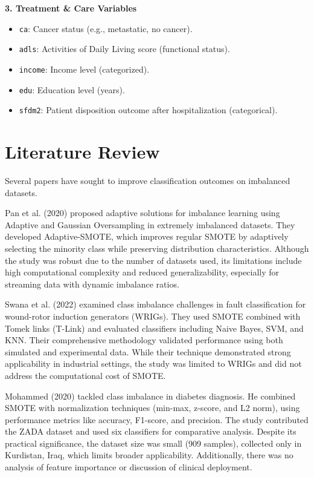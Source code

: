 \textbf{3. Treatment \& Care Variables}
\begin{itemize}
    \item \texttt{ca}: Cancer status (e.g., metastatic, no cancer).
    \item \texttt{adls}: Activities of Daily Living score (functional status).
    \item \texttt{income}: Income level (categorized).
    \item \texttt{edu}: Education level (years).
    \item \texttt{sfdm2}: Patient disposition outcome after hospitalization (categorical).
\end{itemize}

\section{Literature Review}

Several papers have sought to improve classification outcomes on imbalanced datasets.

Pan et al. (2020) proposed adaptive solutions for imbalance learning using
 Adaptive and Gaussian Oversampling in extremely imbalanced datasets. 
 They developed Adaptive-SMOTE, which improves regular SMOTE by adaptively
  selecting the minority class while preserving distribution characteristics. 
  Although the study was robust due to the number of datasets used, its limitations
   include high computational complexity and reduced generalizability, especially for streaming data with dynamic imbalance ratios.

Swana et al. (2022) examined class imbalance challenges in fault classification for
 wound-rotor induction generators (WRIGs). They used SMOTE combined with Tomek links 
 (T-Link) and evaluated classifiers including Naive Bayes, SVM, and KNN. 
 Their comprehensive methodology validated performance using both simulated and experimental data.
  While their technique demonstrated strong applicability in industrial settings, 
  the study was limited to WRIGs and did not address the computational cost of SMOTE.

Mohammed (2020) tackled class imbalance in diabetes diagnosis. He combined SMOTE with 
normalization techniques (min-max, z-score, and L2 norm), using performance metrics like accuracy,
 F1-score, and precision. The study contributed the ZADA dataset and used six classifiers for comparative analysis. 
 Despite its practical significance, the dataset size was small (909 samples), collected only in Kurdistan,
  Iraq, which limits broader applicability. Additionally, there was no analysis of feature importance or discussion of clinical deployment.